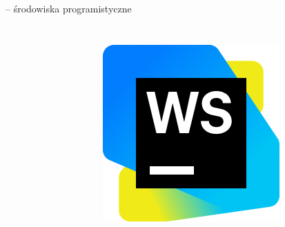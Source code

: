 \begin{frame}{\insertsection \space-- środowiska programistyczne}
\begin{columns}
\begin{figure}
				\label{fig:intellijideaicon}
			\end{figure}		
			\begin{figure}
				\centering
				\includegraphics[width=1\linewidth]{../images/WebStorm_icon}
				\label{fig:webstormicon}
			\end{figure}		
	\end{columns}
\end{frame}

